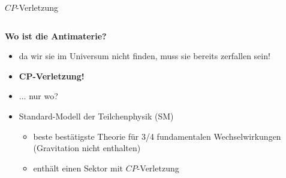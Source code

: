 \begin{frame}{$C\!P$-Verletzung}
    \begin{columns}[T]
        \begin{column}{.6\textwidth}
            \textbf{Wo ist die Antimaterie?}
            \begin{itemize}
                \item<1-> da wir sie im Universum nicht finden, muss sie bereits zerfallen sein!
                \item<1-> \textbf{$\pmb{C\!P}$-Verletzung!}
                \item<1-> ... nur wo?
                \item<2-> Standard-Modell der Teilchenphysik (SM)
                \begin{itemize}
                    \item<2-> beste best\"atigste Theorie f\"ur 3/4 fundamentalen Wechselwirkungen (Gravitation nicht enthalten)
                    \item<2-> enth\"alt einen Sektor mit $C\!P$-Verletzung
                \end{itemize}
            \end{itemize}
        \end{column}
        \begin{column}{.4\textwidth}
            \centering
        \end{column}
    \end{columns}
\end{frame}

